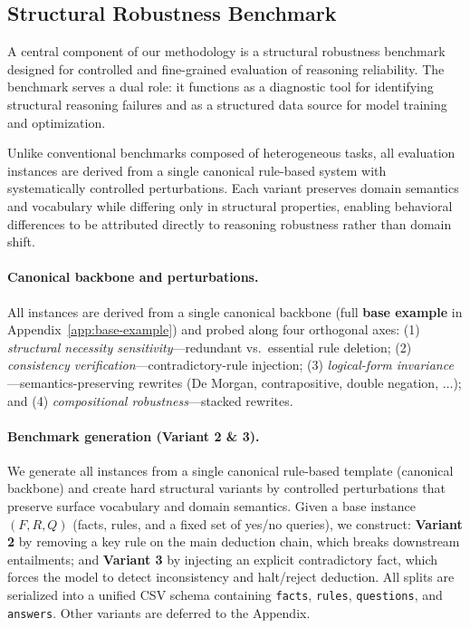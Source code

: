 \documentclass{article} %
\begin{document}
\subsection{Structural Robustness Benchmark}

A central component of our methodology is a structural robustness benchmark designed for controlled and fine-grained evaluation of reasoning reliability. The benchmark serves a dual role: it functions as a diagnostic tool for identifying structural reasoning failures and as a structured data source for model training and optimization.

Unlike conventional benchmarks composed of heterogeneous tasks, all evaluation instances are derived from a single canonical rule-based system with systematically controlled perturbations. Each variant preserves domain semantics and vocabulary while differing only in structural properties, enabling behavioral differences to be attributed directly to reasoning robustness rather than domain shift.

\paragraph{Canonical backbone and perturbations.}
All instances are derived from a single canonical backbone (full \textbf{base example} in Appendix~\ref{app:base-example}) and probed along four orthogonal axes: (1) \emph{structural necessity sensitivity}---redundant vs.\ essential rule deletion; (2) \emph{consistency verification}---contradictory-rule injection; (3) \emph{logical-form invariance}---semantics-preserving rewrites (De Morgan, contrapositive, double negation, $\ldots$); and (4) \emph{compositional robustness}---stacked rewrites.

\paragraph{Benchmark generation (Variant 2 \& 3).}
We generate all instances from a single canonical rule-based template (canonical backbone) and create
hard structural variants by controlled perturbations that preserve surface vocabulary and domain semantics.
Given a base instance $(F,R,Q)$ (facts, rules, and a fixed set of yes/no queries), we construct:
\textbf{Variant 2} by removing a key rule on the main deduction chain, which breaks downstream entailments;
and \textbf{Variant 3} by injecting an explicit contradictory fact, which forces the model to detect inconsistency and halt/reject deduction.
All splits are serialized into a unified CSV schema containing \texttt{facts}, \texttt{rules}, \texttt{questions}, and \texttt{answers}.
Other variants are deferred to the Appendix.
\end{document}
